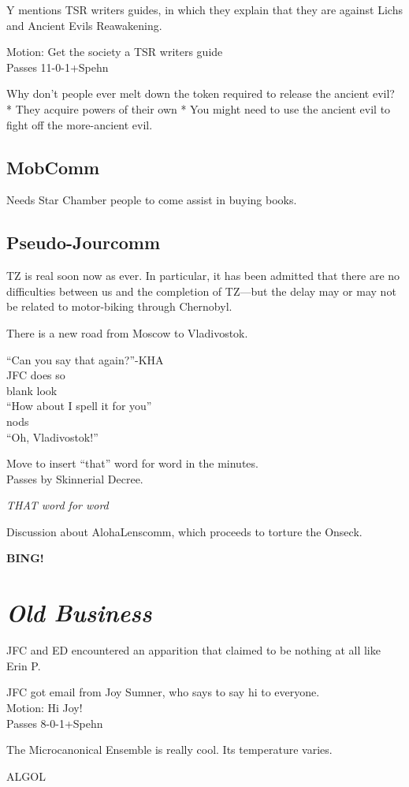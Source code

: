 \documentclass[10pt]{article}
\newcommand{\bing}{{\bf BING!} }
\newcommand{\goto}[1]{\bing \vskip 12pt \section*{{\em{#1}}}}
\begin{document}
Y mentions TSR writers guides, in which they explain that they are
against Lichs and Ancient Evils Reawakening.

Motion: Get the society a TSR writers guide\\
Passes 11-0-1+Spehn

Why don't people ever melt down the token required to release the
ancient evil?
* They acquire powers of their own
* You might need to use the ancient evil to fight off the more-ancient evil.

\subsection*{MobComm}
Needs Star Chamber people to come assist in buying books.

\subsection*{Pseudo-Jourcomm}
TZ is real soon now as ever.  In particular, it has been admitted that
there are no difficulties between us and the completion of TZ---but
the delay may or may not be related to motor-biking through Chernobyl.

There is a new road from Moscow to Vladivostok.

``Can you say that again?''-KHA\\
JFC does so\\
blank look\\
``How about I spell it for you''\\
nods\\
``Oh, Vladivostok!''

Move to insert ``that'' word for word in the minutes.\\
Passes by Skinnerial Decree.

\emph{THAT word for word}

Discussion about AlohaLenscomm, which proceeds to torture the Onseck.

\goto{Old Business} 

JFC and ED encountered an apparition that claimed to be nothing at all
like Erin P.

JFC got email from Joy Sumner, who says to say hi to everyone.\\
Motion: Hi Joy!\\
Passes 8-0-1+Spehn

The Microcanonical Ensemble is really cool.  Its temperature varies.

ALGOL
\end{document}
